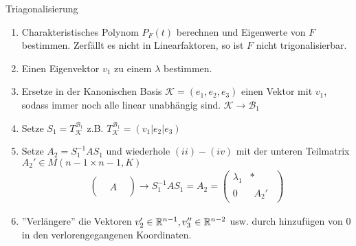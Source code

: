 \begin{rezept}{Triagonalisierung}
    \begin{enumerate}[{(}i{)}]
        \item	Charakteristisches Polynom $P_F(t)$ berechnen und Eigenwerte von $F$ bestimmen. Zerfällt es nicht in Linearfaktoren, so ist $F$ nicht trigonalisierbar. 
        \item Einen Eigenvektor $v_1$ zu einem $\lambda$ bestimmen. 
        \item   Ersetze in der Kanonischen Basis $\mathcal{K} = (e_1, e_2, e_3)$ einen Vektor mit $v_1$, sodass immer noch alle linear unabhängig sind. $\mathcal{K} \to \mathcal{B}_1$
        \item   Setze $S_1 = T_{\mathcal{K}}^{\mathcal{B}_1}$ z.B. $T_{\mathcal{K}}^{\mathcal{B}_1} = (v_1|e_2|e_3)$ 
        \item   Setze $A_2 = S_1^{-1} A S_1$ und wiederhole $(ii) - (iv)$ mit der unteren Teilmatrix $A_2' \in M(n-1\times n-1,K)$ %
        \begin{align*}
            \begin{pmatrix}
                & &\\
                & A &\\
                & & 
            \end{pmatrix}
            \to S_1^{-1}AS_1 = A_2 = \begin{pmatrix}
                \lambda_1 & * \\
                0 & \begin{matrix}
                    A_2'
                \end{matrix}
            \end{pmatrix}
        \end{align*}
        \item   ''Verlängere'' die Vektoren $v_2' \in \mathbb{R}^{n-1}, v_3'' \in \mathbb{R}^{n-2}$ usw. durch hinzufügen von $0$ in den verlorengegangenen Koordinaten.
    \end{enumerate}
\end{rezept}




